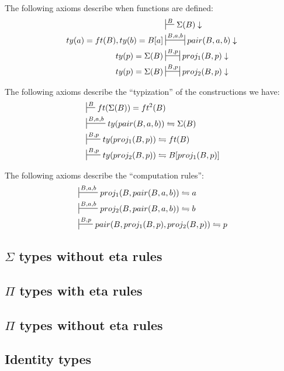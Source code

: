 \documentclass{amsart}
\theoremstyle{definition}
\theoremstyle{remark}
\numberwithin{figure}{section}
\begin{document}
The following axioms describe when functions are defined:
\begin{align*}
                            & \sststile{}{B} \Sigma(B) \downarrow \\
ty(a) = ft(B), ty(b) = B[a] & \ssststile{}{B,a,b} pair(B,a,b) \downarrow \\
ty(p) = \Sigma(B)           & \ssststile{}{B,p} proj_1(B,p) \downarrow \\
ty(p) = \Sigma(B)           & \ssststile{}{B,p} proj_2(B,p) \downarrow
\end{align*}

The following axioms describe the ``typization'' of the constructions we have:
\begin{align*}
& \sststile{}{B} ft(\Sigma(B)) = ft^2(B) \\
& \sststile{}{B,a,b} ty(pair(B,a,b)) \leftrightharpoons \Sigma(B) \\
& \sststile{}{B,p} ty(proj_1(B,p)) \leftrightharpoons ft(B) \\
& \sststile{}{B,p} ty(proj_2(B,p)) \leftrightharpoons B[proj_1(B,p)]
\end{align*}

The following axioms describe the ``computation rules'':
\begin{align*}
& \sststile{}{B,a,b} proj_1(B,pair(B,a,b)) \leftrightharpoons a \\
& \sststile{}{B,a,b} proj_2(B,pair(B,a,b)) \leftrightharpoons b \\
& \sststile{}{B,p} pair(B, proj_1(B,p), proj_2(B,p)) \leftrightharpoons p \\
\end{align*}

\subsection{$\Sigma$ types without eta rules}

\subsection{$\Pi$ types with eta rules}

\subsection{$\Pi$ types without eta rules}

\subsection{Identity types}
\end{document}
